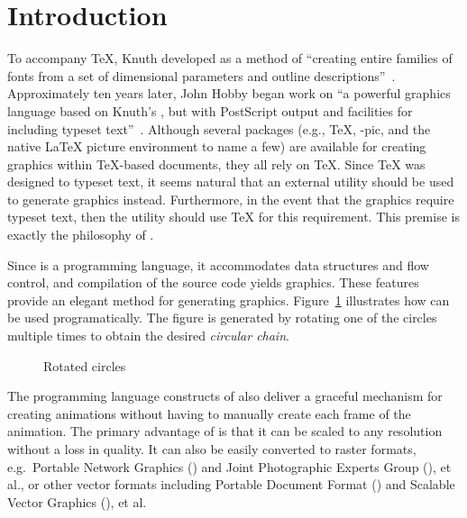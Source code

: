 \section{Introduction}
\label{sec:introduction}

\addtocounter{footnote}{1}%
To accompany \TeX{}, Knuth developed \MF{} as a method of ``creating
entire families of fonts from a set of dimensional parameters and
outline descriptions''~\cite{beebe:mf}.  Approximately ten years later,
John Hobby began work on \MP{}\Dash ``a powerful graphics language based
on Knuth's \MF, but with PostScript output and facilities for including
typeset text''~\cite{hobby:user}.  Although several packages (e.g.,
\PiC\TeX, \Xy-pic, and the native \LaTeX{} picture environment to name a
few) are available for creating graphics within \TeX-based documents,
they all rely on \TeX{}.  Since \TeX{} was designed to typeset text, it
seems natural that an external utility should be used to generate
graphics instead.  Furthermore, in the event that the graphics require
typeset text, then the utility should use \TeX{} for this requirement.
This premise is exactly the philosophy of \MP.

Since \MP{} is a programming language, it accommodates data structures
and flow control, and compilation of the \MP{} source code yields \EPS{}
graphics.  These features provide an elegant method for generating
graphics.  Figure~\ref{fig:circles} illustrates how \MP{} can be used
programatically.  The figure is generated by rotating one of the circles
multiple times to obtain the desired \textit{circular chain}.

\begin{figure}[hptb]
  \begin{center}
  \end{center}
	\caption{Rotated circles}
  \label{fig:circles}
\end{figure}

The programming language constructs of \MP{} also deliver a graceful
mechanism for creating animations without having to manually create each
frame of the animation.  The primary advantage of \EPS{} is that it can
be scaled to any resolution without a loss in quality.  It can also be
easily converted to raster formats, e.g.\ Portable Network Graphics
(\PNG) and Joint Photographic Experts Group (\JPEG), et al., or other
vector formats including Portable Document Format (\PDF) and Scalable
Vector Graphics (\SVG), et al.
